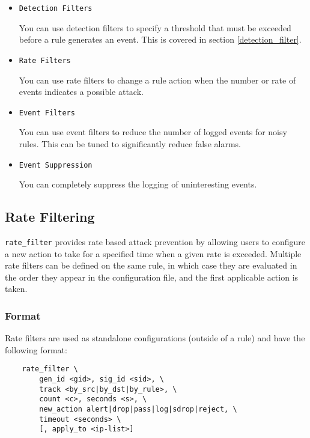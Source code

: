 \documentclass[english]{report}
\begin{document}
\begin{itemize} 
\item \texttt{Detection Filters} 

You can use detection filters to specify a threshold that must be exceeded
before a rule generates an event.  This is covered in section
\ref{detection_filter}.

\item \texttt{Rate Filters} 

You can use rate filters to change a rule action when the number or rate of
events indicates a possible attack.

\item \texttt{Event Filters} 

You can use event filters to reduce the number of logged events for noisy
rules.  This can be tuned to significantly reduce false alarms.

\item \texttt{Event Suppression} 

You can completely suppress the logging of uninteresting events.

\end{itemize} 

\subsection{Rate Filtering}
\label{rate_filtering}

\texttt{rate\_filter} provides rate based attack prevention by allowing users
to configure a new action to take for a specified time when a given rate is
exceeded.  Multiple rate filters can be defined on the same rule, in which case
they are evaluated in the order they appear in the configuration file, and the
first applicable action is taken.  

\subsubsection{Format}

Rate filters are used as standalone configurations (outside of a rule) and have
the following format:

\begin{verbatim}
    rate_filter \
        gen_id <gid>, sig_id <sid>, \
        track <by_src|by_dst|by_rule>, \
        count <c>, seconds <s>, \
        new_action alert|drop|pass|log|sdrop|reject, \
        timeout <seconds> \
        [, apply_to <ip-list>]
\end{verbatim}
\end{document}
